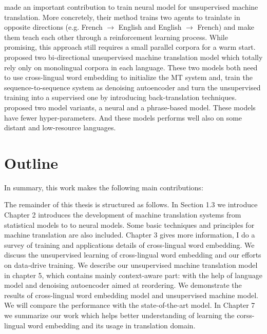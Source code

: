 \cite{he2016dual} made an important contribution to train neural model for unsupervised machine translation. More concretely, their method trains two agents to trainlate in opposite directions (e.g. French ${\rightarrow}$ English and English ${\rightarrow}$ French) and make them teach each other through a reinforcement learning process. While promising, this approach still requires a small parallel corpora for a warm start.  
\cite{artetxe2017unsupervised} \cite{lample2017unsupervised} proposed two bi-directional unsupervised machine translation model which totally rely only on monolingual corpora in each language. These two models both need to use cross-lingual word embedding to initialize the MT system and, train the sequence-to-sequence system as denoising autoencoder and turn the unsupervised training into a supervised one by introducing back-translation techniques.
\cite{lample2018phrase} proposed two model variants, a neural and a phrase-based model. These models have fewer hyper-parameters. And these models performs well also on some distant and low-resource languages.
\section{Outline}
In summary, this work makes the following main contributions:

The remainder of this thesis is structured as follows. In Section 1.3 we introduce 
Chapter 2 introduces the development of machine translation systems from statistical models to to neural models. Some basic techniques and principles for machine translation are also included.  Chapter 3 gives more information,  I do a survey of training and applications details of cross-lingual word embedding. We discuss the unsupervised learning of cross-lingual word embedding and our efforts on data-drive training. We describe our unsupervised machine translation model in chapter 5, which contains mainly context-aware part: with the help of language model and denoising autoencoder aimed at reordering. We demonstrate the results of cross-lingual word embedding model and unsupervised machine model. We will compare the performance with the state-of-the-art model. In Chapter 7 we summarize our work which helps better understanding of learning the corss-lingual word embedding and its usage in translation domain.


